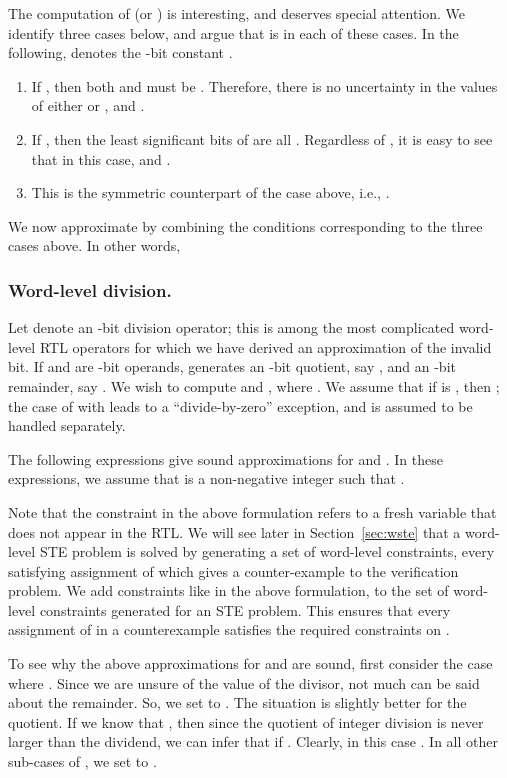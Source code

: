 \documentclass{llncs}
\begin{document}
The computation of  (or ) is
interesting, and deserves special attention.  We identify three cases
below, and argue that  is  in each of these
cases.  In the following,  denotes the -bit constant
.
\begin{enumerate}
\item If ,
  then both  and  must be
  .  Therefore, there is no uncertainty in the values of
  either  or , and .
\item If , then the least significant  bits of
   are all .  Regardless of , it is easy to
  see that in this case,  and .
\item This is the symmetric counterpart of the case above, i.e.,
  .
\end{enumerate}
We now approximate  by combining the conditions
corresponding to the three cases above.  In other words,


\subsubsection{Word-level division.} Let  denote an
-bit division operator; this is among the most complicated
word-level RTL operators for which we have derived an approximation of
the invalid bit.  If  and  are -bit operands, 
generates an -bit quotient, say , and an -bit remainder,
say .  We wish to compute  and
, where .  We assume that if
 is , then ; the case of 
with  leads to a
``divide-by-zero'' exception, and is assumed to be handled separately.

The following expressions give sound approximations for
 and .  In these expressions, we
assume that  is a non-negative integer such that .  


Note that the constraint  in the
above formulation refers to a fresh variable  that does not
appear in the RTL.  
We will see later in Section~\ref{sec:wste} that a word-level STE
problem is solved by generating a set of word-level constraints, every
satisfying assignment of which gives a counter-example to the
verification problem.  We add constraints like  in the above formulation, to the set of word-level
constraints generated for an STE problem.  This ensures that every
assignment of  in a counterexample satisfies the required
constraints on .



To see why the above approximations for  and
 are sound, first consider the case where
.  Since we are unsure of the value of the divisor,
not much can be said about the remainder.  So, we set
 to .  The situation is slightly better for
the quotient.  If we know that , then since the
quotient of integer division is never larger than the dividend, we can
infer that  if .  Clearly, in this case
.  In all other sub-cases of , we set  to .
\end{document}
